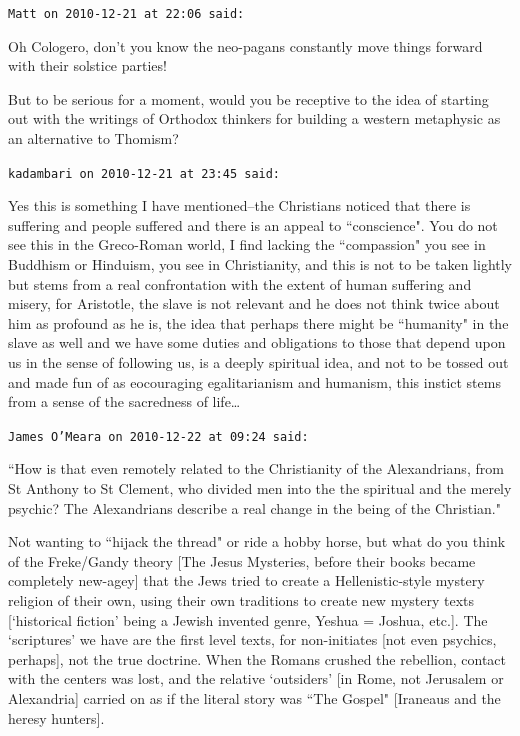 \begin{footnotesize}\begin{sffamily}



\texttt{Matt on 2010-12-21 at 22:06 said: }

Oh Cologero, don't you know the neo-pagans constantly move things forward with their solstice parties!

But to be serious for a moment, would you be receptive to the idea of starting out with the writings of Orthodox thinkers for building a western metaphysic as an alternative to Thomism?


\hfill

\texttt{kadambari on 2010-12-21 at 23:45 said: }

Yes this is something I have mentioned–the Christians noticed that there is suffering and people suffered and there is an appeal to ``conscience". You do not see this in the Greco-Roman world, I find lacking the ``compassion" you see in Buddhism or Hinduism, you see in Christianity, and this is not to be taken lightly but stems from a real confrontation with the extent of human suffering and misery, for Aristotle, the slave is not relevant and he does not think twice about him as profound as he is, the idea that perhaps there might be ``humanity" in the slave as well and we have some duties and obligations to those that depend upon us in the sense of following us, is a deeply spiritual idea, and not to be tossed out and made fun of as eocouraging egalitarianism and humanism, this instict stems from a sense of the sacredness of life…


\hfill

\texttt{James O'Meara on 2010-12-22 at 09:24 said: }

``How is that even remotely related to the Christianity of the Alexandrians, from St Anthony to St Clement, who divided men into the the spiritual and the merely psychic? The Alexandrians describe a real change in the being of the Christian."

Not wanting to ``hijack the thread" or ride a hobby horse, but what do you think of the Freke/Gandy theory [The Jesus Mysteries, before their books became completely new-agey] that the Jews tried to create a Hellenistic-style mystery religion of their own, using their own traditions to create new mystery texts [`historical fiction' being a Jewish invented genre, Yeshua = Joshua, etc.]. The `scriptures' we have are the first level texts, for non-initiates [not even psychics, perhaps], not the true doctrine. When the Romans crushed the rebellion, contact with the centers was lost, and the relative `outsiders' [in Rome, not Jerusalem or Alexandria] carried on as if the literal story was ``The Gospel" [Iraneaus and the heresy hunters]. 


\end{sffamily}
\end{footnotesize}
